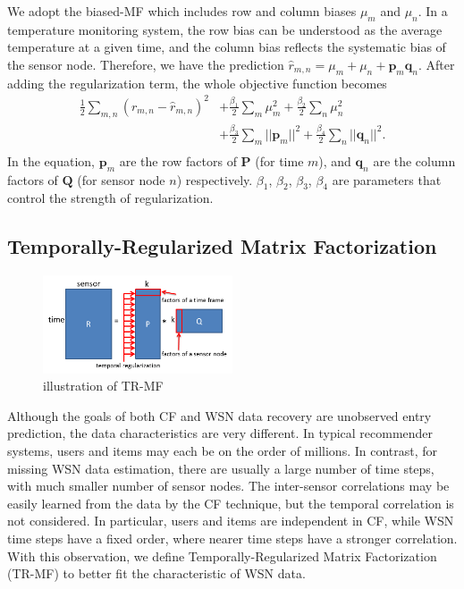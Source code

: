 We adopt the biased-MF which includes row and column biases $\mu_m$ and $\mu_n$. %
In a temperature monitoring system, the row bias can be understood as the average temperature at a given time, and the column bias reflects the systematic bias of the sensor node.
Therefore, we have the prediction $\hat{r}_{m,n} = \mu_m + \mu_n + \mathbf{p}_m \mathbf{q}_n$.
After adding the regularization term, the whole objective function becomes
\begin{equation*}\begin{aligned}
\frac{1}{2}\sum_{m,n}{(r_{m,n} - \hat{r}_{m,n})}^2 & + \frac{\beta_1}{2}\sum_m{\mu_m^2} + \frac{\beta_2}{2}\sum_n{\mu_n^2}\\
& + \frac{\beta_3}{2}\sum_m{||\mathbf{p}_m||^2} + \frac{\beta_4}{2}\sum_n{||\mathbf{q}_n||^2}.\\
\end{aligned}\end{equation*}
In the equation, $\mathbf{p}_m$ are the row factors of $\mathbf{P}$ (for time $m$), and $\mathbf{q}_n$ are the column factors of $\mathbf{Q}$ (for sensor node $n$) respectively.
$\beta_1$, $\beta_2$, $\beta_3$, $\beta_4$ are parameters that control the strength of regularization.

\subsection{Temporally-Regularized Matrix Factorization}

\begin{figure}[htbp]
	\centering
	\includegraphics[width=0.5\textwidth]{TRMF_illustration.png}
	\caption{illustration of TR-MF}
\end{figure}


Although the goals of both CF and WSN data recovery are unobserved entry prediction, the data characteristics are very different.
In typical recommender systems, users and items may each be on the order of millions.
In contrast, for missing WSN data estimation, there are usually a large number of time steps, with much smaller number of sensor nodes.
The inter-sensor correlations may be easily learned from the data by the CF technique, but the temporal correlation is not considered.
In particular, users and items are independent in CF, while WSN time steps have a fixed order, where nearer time steps have a stronger correlation.
With this observation, we define Temporally-Regularized Matrix Factorization (TR-MF) to better fit the characteristic of WSN data. 

